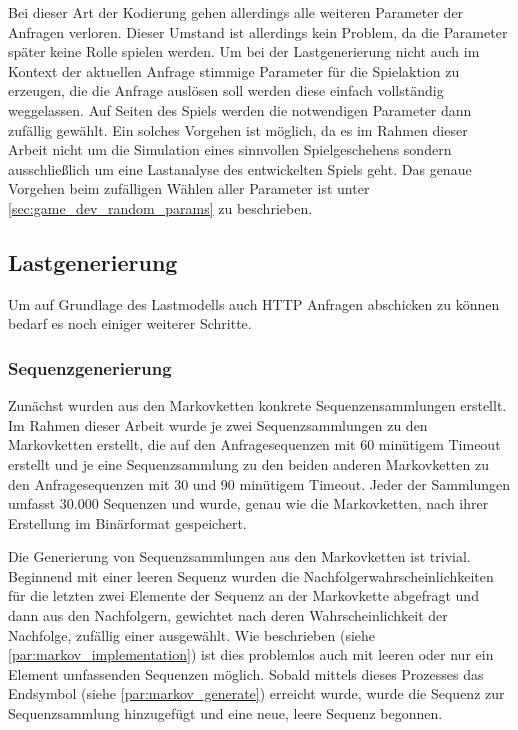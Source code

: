 \documentclass[10pt]{scrartcl}
\begin{document}
  Bei dieser Art der Kodierung gehen allerdings alle weiteren Parameter der Anfragen verloren. Dieser Umstand ist allerdings kein Problem, da die Parameter später keine Rolle spielen werden. Um bei der Lastgenerierung nicht auch im Kontext der aktuellen Anfrage stimmige Parameter für die Spielaktion zu erzeugen, die die Anfrage auslösen soll werden diese einfach vollständig weggelassen. Auf Seiten des Spiels werden die notwendigen Parameter dann zufällig gewählt. Ein solches Vorgehen ist möglich, da es im Rahmen dieser Arbeit nicht um die Simulation eines sinnvollen Spielgeschehens sondern ausschließlich um eine Lastanalyse des entwickelten Spiels geht. Das genaue Vorgehen beim zufälligen Wählen aller Parameter ist unter \ref{sec:game_dev_random_params} zu beschrieben.
  
  
  \subsection{Lastgenerierung}
  Um auf Grundlage des Lastmodells auch HTTP Anfragen abschicken zu können bedarf es noch einiger weiterer Schritte.
  
  \subsubsection{Sequenzgenerierung}
  Zunächst wurden aus den Markovketten konkrete Sequenzensammlungen erstellt. Im Rahmen dieser Arbeit wurde je zwei Sequenzsammlungen zu den Markovketten erstellt, die auf den Anfragesequenzen mit 60 minütigem Timeout erstellt und je eine Sequenzsammlung zu den beiden anderen Markovketten zu den Anfragesequenzen mit 30 und 90 minütigem Timeout. Jeder der Sammlungen umfasst 30.000 Sequenzen und wurde, genau wie die Markovketten, nach ihrer Erstellung im Binärformat gespeichert.
  
  Die Generierung von Sequenzsammlungen aus den Markovketten ist trivial. Beginnend mit einer leeren Sequenz wurden die Nachfolgerwahrscheinlichkeiten für die letzten zwei Elemente der Sequenz an der Markovkette abgefragt und dann aus den Nachfolgern, gewichtet nach deren Wahrscheinlichkeit der Nachfolge, zufällig einer ausgewählt. Wie beschrieben (siehe \ref{par:markov_implementation}) ist dies problemlos auch mit leeren oder nur ein Element umfassenden Sequenzen möglich. Sobald mittels dieses Prozesses das Endsymbol (siehe \ref{par:markov_generate}) erreicht wurde, wurde die Sequenz zur Sequenzsammlung hinzugefügt und eine neue, leere Sequenz begonnen.
  
\end{document}
